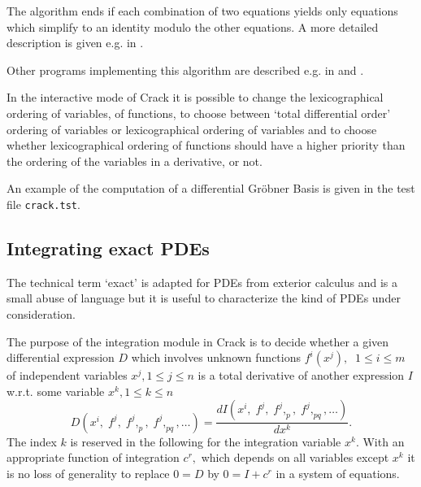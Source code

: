 \documentclass[12pt]{article}
\begin{document}
The algorithm ends if each combination of two equations yields only equations
which simplify to an identity modulo the other equations.
A more detailed description is given e.g. in \cite{Alex,Reid1}.

Other programs implementing this algorithm are described e.g. in
\cite{FS,Alex,Fush,Reid1,Reid2,Reid3} and \cite{Mans}.

In the interactive mode of {\sc Crack} it is possible to change the
lexicographical ordering of variables, of functions, to choose between
`total differential order' ordering of variables or lexicographical
ordering of variables and to choose whether lexicographical ordering
of functions should have a higher priority than the ordering of the
variables in a derivative, or not.

An example of the computation of a differential Gr\"{o}bner Basis is
given in the test file {\tt crack.tst}.

\subsection{Integrating exact PDEs}
The technical term `exact' is adapted for PDEs from exterior calculus and
is a small abuse of language but it is useful to characterize the kind of PDEs
under consideration.

The purpose of the integration module in {\sc Crack} is to  decide
whether a given differential
expression $D$ which involves unknown functions $f^i(x^j),\;\; 1\leq i\leq m$
of independent variables $x^j, 1\leq j\leq n$
is a total derivative of another expression $I$
w.r.t. some variable $x^k, 1\leq k\leq n$
\[ D(x^i,\; f^j,\; f^j,_p,\; f^j,_{pq}, \ldots)
     = \frac{d I(x^i,\; f^j,\; f^j,_p,\; f^j,_{pq}, \ldots)}{d x^k}. \]
The index $k$ is
reserved in the following for the integration variable $x^k.$
With an appropriate function of integration $c^r,$
which depends on all variables except $x^k$ it is no loss of generality
to replace $0 = D$ by $0 = I + c^r$ in a system of equations.
\end{document}

